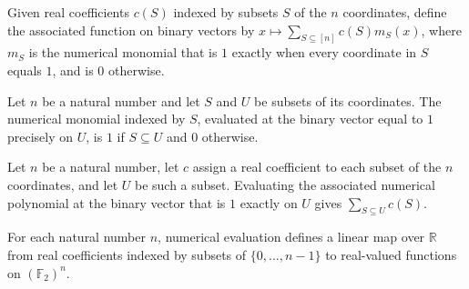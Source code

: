 \begin{definition}
\label{FABL.numericalEval}
\leanok
{}
Given real coefficients $c(S)$ indexed by subsets $S$ of the $n$ coordinates, define the
associated function on binary vectors by $x\mapsto\sum_{S\subseteq[n]}c(S)m_S(x)$, where
$m_S$ is the numerical monomial that is $1$ exactly when every coordinate in $S$ equals
$1$, and is $0$ otherwise.
\end{definition}

\begin{theorem}
\leanok
{}
Let $n$ be a natural number and let $S$ and $U$ be subsets of its coordinates. The
numerical monomial indexed by $S$, evaluated at the binary vector equal to $1$ precisely
on $U$, is $1$ if $S\subseteq U$ and $0$ otherwise.
\end{theorem}

\begin{theorem}
\leanok
{}
Let $n$ be a natural number, let $c$ assign a real coefficient to each subset of the $n$
coordinates, and let $U$ be such a subset. Evaluating the associated numerical
polynomial at the binary vector that is $1$ exactly on $U$ gives $\sum_{S\subseteq
U}c(S)$.
\end{theorem}

\begin{definition}
\label{FABL.numericalEvalLinear}
\leanok
{}
For each natural number $n$, numerical evaluation defines a linear map over $\mathbb{R}$
from real coefficients indexed by subsets of $\{0,\ldots,n-1\}$ to real-valued functions
on $(\mathbb{F}_2)^n$.
\end{definition}

